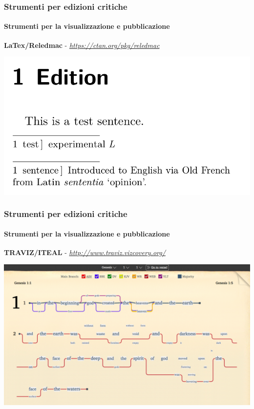 \begin{frame}
    \frametitle{Strumenti per edizioni critiche}
    \framesubtitle{Strumenti per la visualizzazione e pubblicazione}
	\addtocounter{nframe}{1}
    \begin{center}
        \textbf{LaTex/Reledmac} -  \textit{\url{https://ctan.org/pkg/reledmac}}
    \end{center}
    \begin{center}
        \includegraphics[width=.95\textwidth]{imgs/reledmac-test.png}
	\end{center}
\end{frame}

\begin{frame}
    \frametitle{Strumenti per edizioni critiche}
    \framesubtitle{Strumenti per la visualizzazione e pubblicazione}
	\addtocounter{nframe}{1}
    \begin{center}
        \textbf{TRAVIZ/ITEAL} - \textit{\url{http://www.traviz.vizcovery.org/}}
    \end{center}
    \begin{center}
        \includegraphics[width=.95\textwidth]{imgs/traviz.png}
	\end{center}
\end{frame}

